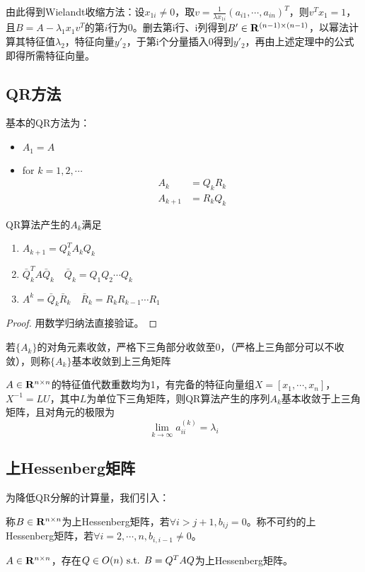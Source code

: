 \documentclass{ctexart}
\begin{document}
由此得到Wielandt收缩方法：设$x_{1i}\neq 0$，取$v=\frac{1}{\lambda x_{1i}}(a_{i1},\cdots,a_{in})^T$，则$v^Tx_1=1$，且$B=A-\lambda_1x_1v^T$的第$i$行为0。删去第i行、i列得到$B'\in\mathbf{R}^{(n-1)\times (n-1)}$，以幂法计算其特征值$\lambda_2$，特征向量$y'_2$，于第i个分量插入0得到$y'_2$，再由上述定理中的公式即得所需特征向量。

\subsection{QR方法}
基本的QR方法为：
\begin{itemize}
\item $A_1=A$
\item for $k=1,2,\cdots$
\begin{align*}
A_k&=Q_kR_k\\
A_{k+1}&=R_kQ_k
\end{align*}
\end{itemize}

\begin{Thm}
QR算法产生的$A_k$满足
\begin{enumerate}
\item $A_{k+1}=Q_k^TA_kQ_k$
\item $\bar Q_k^TA\bar Q_k\quad \bar Q_k=Q_1Q_2\cdots Q_k$
\item $A^k=\bar Q_k\bar R_k\quad \bar R_k=R_kR_{k-1}\cdots R_1$
\end{enumerate}
\end{Thm}
\begin{proof}
用数学归纳法直接验证。
\end{proof}

\begin{Def}
若$\{A_k\}$的对角元素收敛，严格下三角部分收敛至$0$，（严格上三角部分可以不收敛），则称$\{A_k\}$基本收敛到上三角矩阵
\end{Def}

\begin{Thm}
$A\in\mathbf{R}^{n\times n}$的特征值代数重数均为1，有完备的特征向量组$X=[x_1,\cdots,x_n]$，$X^{-1}=LU$，其中$L$为单位下三角矩阵，则QR算法产生的序列$A_k$基本收敛于上三角矩阵，且对角元的极限为
\[\lim_{k\to\infty}a_{ii}^{(k)}=\lambda_i\]
\end{Thm}

\subsection{上Hessenberg矩阵}
为降低QR分解的计算量，我们引入：
\begin{Def}
称$B\in\mathbf{R}^{n\times n}$为上Hessenberg矩阵，若$\forall i>j+1,b_{ij}=0$。称不可约的上Hessenberg矩阵，若$\forall i=2,\cdots,n, b_{i,i-1}\neq 0$。
\end{Def}
\begin{Thm}
$A\in\mathbf{R}^{n\times n}$，存在$Q\in O(n)\text{ s.t. } B=Q^TAQ$为上Hessenberg矩阵。
\end{Thm}
\end{document}
